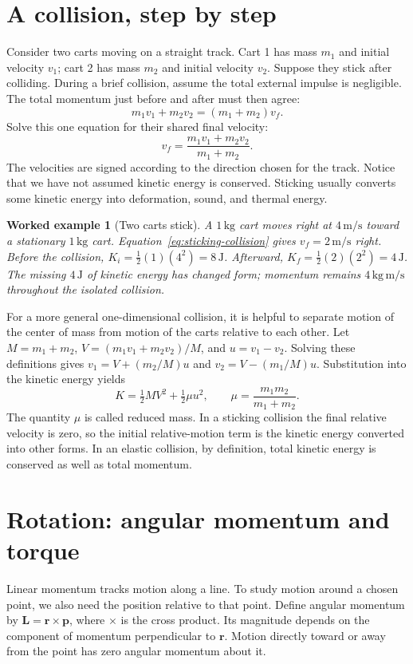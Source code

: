 \documentclass[11pt,oneside]{book}
\newcommand{\vect}[1]{\boldsymbol{#1}}
\theoremstyle{reviewstyle}
\newtheorem{example}{Worked example}[chapter]
\begin{document}
\section{A collision, step by step}
Consider two carts moving on a straight track. Cart 1 has mass $m_1$ and initial velocity $v_1$; cart 2 has mass $m_2$ and initial velocity $v_2$. Suppose they stick after colliding. During a brief collision, assume the total external impulse is negligible. The total momentum just before and after must then agree:
\begin{equation}
m_1v_1+m_2v_2=(m_1+m_2)v_f.
\end{equation}
Solve this one equation for their shared final velocity:
\begin{equation}
v_f=\frac{m_1v_1+m_2v_2}{m_1+m_2}.
\label{eq:sticking-collision}
\end{equation}
The velocities are signed according to the direction chosen for the track. Notice that we have not assumed kinetic energy is conserved. Sticking usually converts some kinetic energy into deformation, sound, and thermal energy.

\begin{example}[Two carts stick]
A $1\,\mathrm{kg}$ cart moves right at $4\,\mathrm{m/s}$ toward a stationary $1\,\mathrm{kg}$ cart. Equation~\eqref{eq:sticking-collision} gives $v_f=2\,\mathrm{m/s}$ right. Before the collision, $K_i=\tfrac12(1)(4^2)=8\,\mathrm J$. Afterward, $K_f=\tfrac12(2)(2^2)=4\,\mathrm J$. The missing $4\,\mathrm J$ of kinetic energy has changed form; momentum remains $4\,\mathrm{kg\,m/s}$ throughout the isolated collision.
\end{example}

For a more general one-dimensional collision, it is helpful to separate motion of the center of mass from motion of the carts relative to each other. Let $M=m_1+m_2$, $V=(m_1v_1+m_2v_2)/M$, and $u=v_1-v_2$. Solving these definitions gives $v_1=V+(m_2/M)u$ and $v_2=V-(m_1/M)u$. Substitution into the kinetic energy yields
\begin{equation}
K=\tfrac12MV^2+\tfrac12\mu u^2,
\qquad \mu=\frac{m_1m_2}{m_1+m_2}.
\end{equation}
The quantity $\mu$ is called reduced mass. In a sticking collision the final relative velocity is zero, so the initial relative-motion term is the kinetic energy converted into other forms. In an elastic collision, by definition, total kinetic energy is conserved as well as total momentum.

\section{Rotation: angular momentum and torque}
Linear momentum tracks motion along a line. To study motion around a chosen point, we also need the position relative to that point. Define angular momentum by $\vect L=\vect r\times\vect p$, where $\times$ is the cross product. Its magnitude depends on the component of momentum perpendicular to $\vect r$. Motion directly toward or away from the point has zero angular momentum about it.
\end{document}
